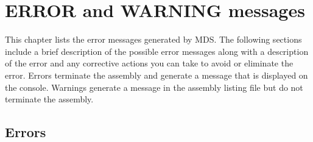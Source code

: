     \clearpage

\section{ERROR and WARNING messages}
    This chapter lists the error messages generated by MDS. The following sections include a brief description of the possible error messages along with a description of the error and any corrective actions you can take to avoid or eliminate the error. Errors terminate the assembly and generate a message that is displayed on the console. Warnings generate a message in the assembly listing file but do not terminate the assembly.

    \subsection{Errors}
